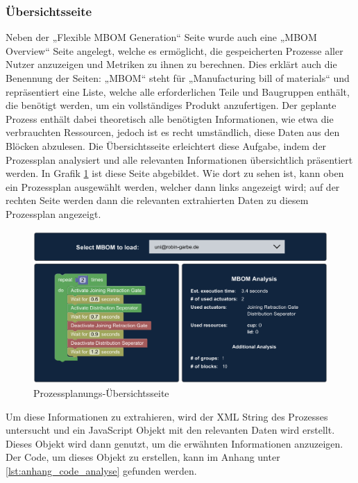 \subsubsection{Übersichtsseite}
\label{subsubsec:prozessplanung_implementation_übersichtsseite}

Neben der „Flexible MBOM Generation“ Seite wurde auch eine „MBOM Overview“ Seite angelegt, welche es ermöglicht, die gespeicherten Prozesse aller Nutzer anzuzeigen und Metriken zu ihnen zu berechnen. Dies erklärt auch die Benennung der Seiten: „MBOM“ steht für „Manufacturing bill of materials“ und repräsentiert eine Liste, welche alle erforderlichen Teile und Baugruppen enthält, die benötigt werden, um ein vollständiges Produkt anzufertigen. Der geplante Prozess enthält dabei theoretisch alle benötigten Informationen, wie etwa die verbrauchten Ressourcen, jedoch ist es recht umständlich, diese Daten aus den Blöcken abzulesen. Die Übersichtsseite erleichtert diese Aufgabe, indem der Prozessplan analysiert und alle relevanten Informationen übersichtlich präsentiert werden. In Grafik \ref{fig:MBOMOverview} ist diese Seite abgebildet. Wie dort zu sehen ist, kann oben ein Prozessplan ausgewählt werden, welcher dann links angezeigt wird; auf der rechten Seite werden dann die relevanten extrahierten Daten zu diesem Prozessplan angezeigt.
%
\begin{figure}[htbp]
	\centering\includegraphics[width=1.0\textwidth]{images/04/MBOMOverview.pdf}
    \caption{Prozessplanungs-Übersichtsseite}
    \label{fig:MBOMOverview}
\end{figure}

Um diese Informationen zu extrahieren, wird der XML String des Prozesses untersucht und ein JavaScript Objekt mit den relevanten Daten wird erstellt. Dieses Objekt wird dann genutzt, um die erwähnten Informationen anzuzeigen. Der Code, um dieses Objekt zu erstellen, kann im Anhang unter \ref{lst:anhang_code_analyse} gefunden werden.

